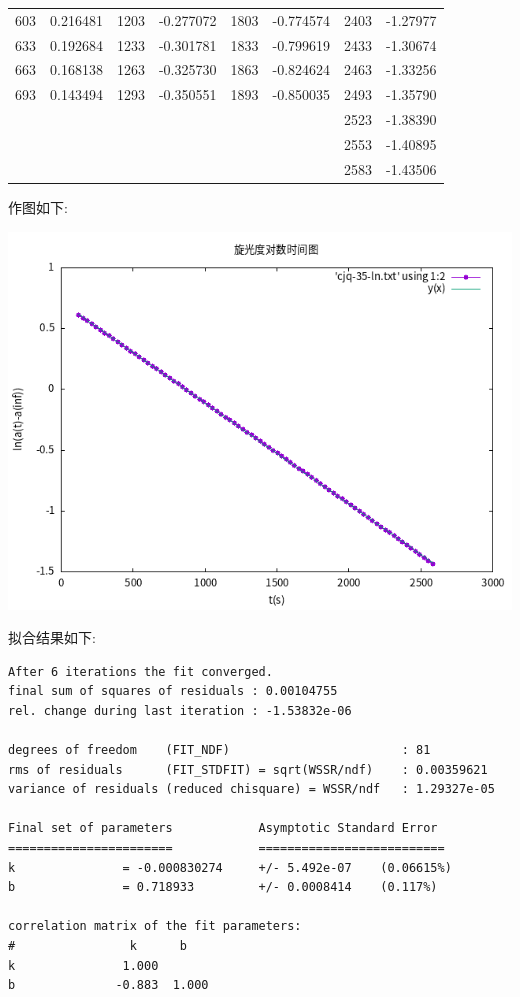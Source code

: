 \documentclass[11pt]{report}
\begin{document}
\begin{enumerate}
\begin{center}
\begin{tabular}{rrrrrrrr}
603 & 0.216481 & 1203 & -0.277072 & 1803 & -0.774574 & 2403 & -1.27977\\
633 & 0.192684 & 1233 & -0.301781 & 1833 & -0.799619 & 2433 & -1.30674\\
663 & 0.168138 & 1263 & -0.325730 & 1863 & -0.824624 & 2463 & -1.33256\\
693 & 0.143494 & 1293 & -0.350551 & 1893 & -0.850035 & 2493 & -1.35790\\
 &  &  &  &  &  & 2523 & -1.38390\\
 &  &  &  &  &  & 2553 & -1.40895\\
 &  &  &  &  &  & 2583 & -1.43506\\
\end{tabular}
\end{center}
作图如下:
\begin{center}
\includegraphics[width=.9\linewidth]{../data/cjq-35-ln.png}
\end{center}
拟合结果如下:
\begin{verbatim}
After 6 iterations the fit converged.
final sum of squares of residuals : 0.00104755
rel. change during last iteration : -1.53832e-06

degrees of freedom    (FIT_NDF)                        : 81
rms of residuals      (FIT_STDFIT) = sqrt(WSSR/ndf)    : 0.00359621
variance of residuals (reduced chisquare) = WSSR/ndf   : 1.29327e-05

Final set of parameters            Asymptotic Standard Error
=======================            ==========================
k               = -0.000830274     +/- 5.492e-07    (0.06615%)
b               = 0.718933         +/- 0.0008414    (0.117%)

correlation matrix of the fit parameters:
#                k      b      
k               1.000 
b              -0.883  1.000 


\end{verbatim}
\end{enumerate}
\end{document}
